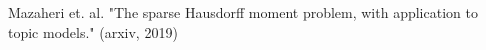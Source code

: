 \documentclass[preview]{standalone}
\begin{document}
\begin{center}
Mazaheri et. al. "The sparse Hausdorff moment problem, with application to topic models." (arxiv, 2019)
\end{center}
\end{document}

